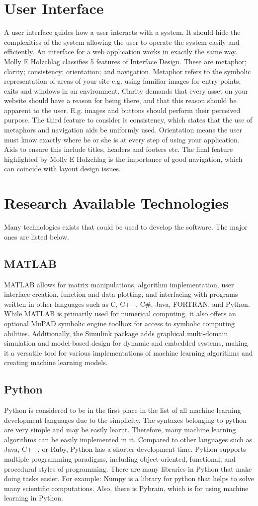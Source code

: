 \documentclass[12pt,a4paper]{report}
\begin{document}
\section{User Interface}
\justify A user interface guides how a user interacts with a system. It should hide the complexities of the system allowing the user to operate the system easily and efficiently. An interface for a web application works in exactly the same way. Molly E Holzchlag classifies 5 features of Interface Design. These are metaphor; clarity; consistency; orientation; and navigation. Metaphor refers to the symbolic representation of areas of your site e.g. using familiar images for entry points, exits and windows in an environment. Clarity demands that every asset on your website should have a reason for being there, and that this reason should be apparent to the user. E.g. images and buttons should perform their perceived purpose. The third feature to consider is consistency, which states that the use of metaphors and navigation aids be uniformly used. Orientation means the user must know exactly where he or she is at every step of using your application. Aids to ensure this include titles, headers and footers etc. The final feature highlighted by Molly E Holzchlag is the importance of good navigation, which can coincide with layout design issues.
\section{Research Available Technologies}
\justify Many technologies exists that could be used to develop the software. The major ones are listed below.
\subsection{MATLAB}
\justify MATLAB allows for matrix manipulations, algorithm implementation, user interface creation, function and data plotting, and interfacing with programs written in other languages such as C, C++, C\#, Java, FORTRAN, and Python. While MATLAB is primarily used for numerical computing, it also offers an optional MuPAD symbolic engine toolbox for access to symbolic computing abilities. Additionally, the Simulink package adds graphical multi-domain simulation and model-based design for dynamic and embedded systems, making it a versatile tool for various implementations of machine learning algorithms and creating machine learning models.
\subsection{Python}
\justify Python is considered to be in the first place in the list of all machine learning development languages due to the simplicity. The syntaxes belonging to python are very simple and may be easily learnt. Therefore, many machine learning algorithms can be easily implemented in it. Compared to other languages such as Java, C++, or Ruby, Python has a shorter development time. Python supports multiple programming paradigms, including object-oriented, functional, and procedural styles of programming. There are many libraries in Python that  make doing tasks easier. For example: Numpy is a library for python that helps to solve many scientific computations. Also, there is Pybrain, which is for using machine learning in Python.
\end{document}
